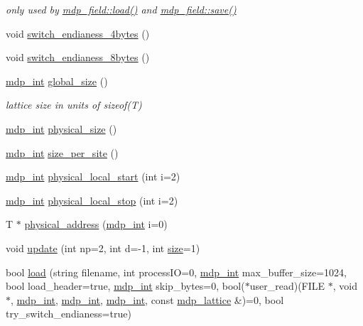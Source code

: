 \begin{DoxyCompactItemize}
\begin{DoxyCompactList}\small\item\em only used by \hyperlink{classmdp__field_a21ce8e89744a826abdc9f5325c714892}{mdp\+\_\+field\+::load()} and \hyperlink{classmdp__field_a66bbe9d66cc3ad2a5955282df3519471}{mdp\+\_\+field\+::save()} \end{DoxyCompactList}\item 
void \hyperlink{classmdp__field_ac9f44455cd31baa03e00ca5b601f199c}{switch\+\_\+endianess\+\_\+4bytes} ()
\item 
void \hyperlink{classmdp__field_a8db821b09a101730bcbcf27ccd1a25f5}{switch\+\_\+endianess\+\_\+8bytes} ()
\item 
\hyperlink{mdp__global__vars_8h_aaa1ad9d0dcd2124aa5af0120d9954174}{mdp\+\_\+int} \hyperlink{classmdp__field_a4deb091e1da25d239e206ee8ff64ae11}{global\+\_\+size} ()
\begin{DoxyCompactList}\small\item\em lattice size in units of sizeof(\+T) \end{DoxyCompactList}\item 
\hyperlink{mdp__global__vars_8h_aaa1ad9d0dcd2124aa5af0120d9954174}{mdp\+\_\+int} \hyperlink{classmdp__field_a0f6da321ba9bdae3a571dbbe5087d799}{physical\+\_\+size} ()
\item 
\hyperlink{mdp__global__vars_8h_aaa1ad9d0dcd2124aa5af0120d9954174}{mdp\+\_\+int} \hyperlink{classmdp__field_a0fc58cc1e14667b4ad3638baab91f28a}{size\+\_\+per\+\_\+site} ()
\item 
\hyperlink{mdp__global__vars_8h_aaa1ad9d0dcd2124aa5af0120d9954174}{mdp\+\_\+int} \hyperlink{classmdp__field_a58b111a6f42e6b3807c6e333fc080020}{physical\+\_\+local\+\_\+start} (int i=2)
\item 
\hyperlink{mdp__global__vars_8h_aaa1ad9d0dcd2124aa5af0120d9954174}{mdp\+\_\+int} \hyperlink{classmdp__field_afc3c5a4aa6512d4b99f08ae58d7e50a7}{physical\+\_\+local\+\_\+stop} (int i=2)
\item 
T $\ast$ \hyperlink{classmdp__field_a345bb93496b3154b4349878d02ab0a2a}{physical\+\_\+address} (\hyperlink{mdp__global__vars_8h_aaa1ad9d0dcd2124aa5af0120d9954174}{mdp\+\_\+int} i=0)
\item 
void \hyperlink{classmdp__field_a72b973da706841ea58dc728345d36795}{update} (int np=2, int d=-\/1, int \hyperlink{classmdp__field_a3dfa0ff545bed811ad055e46020bed7f}{size}=1)
\item 
bool \hyperlink{classmdp__field_a21ce8e89744a826abdc9f5325c714892}{load} (string filename, int process\+IO=0, \hyperlink{mdp__global__vars_8h_aaa1ad9d0dcd2124aa5af0120d9954174}{mdp\+\_\+int} max\+\_\+buffer\+\_\+size=1024, bool load\+\_\+header=true, \hyperlink{mdp__global__vars_8h_aaa1ad9d0dcd2124aa5af0120d9954174}{mdp\+\_\+int} skip\+\_\+bytes=0, bool($\ast$user\+\_\+read)(F\+I\+LE $\ast$, void $\ast$, \hyperlink{mdp__global__vars_8h_aaa1ad9d0dcd2124aa5af0120d9954174}{mdp\+\_\+int}, \hyperlink{mdp__global__vars_8h_aaa1ad9d0dcd2124aa5af0120d9954174}{mdp\+\_\+int}, \hyperlink{mdp__global__vars_8h_aaa1ad9d0dcd2124aa5af0120d9954174}{mdp\+\_\+int}, const \hyperlink{classmdp__lattice}{mdp\+\_\+lattice} \&)=0, bool try\+\_\+switch\+\_\+endianess=true)

\end{DoxyCompactItemize}
